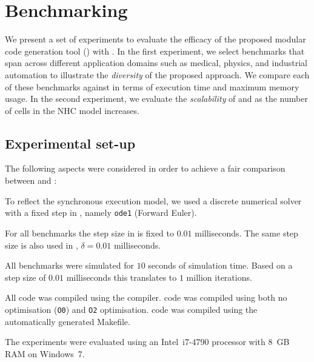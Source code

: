 \section{Benchmarking}
\label{sec:benchmarking}


We present a set of experiments to evaluate the efficacy of the proposed
modular code generation tool (\ourTool) with \simulink.  In the first
experiment, we select benchmarks that span across different application
domains such as medical, physics, and industrial automation to
illustrate the \emph{diversity} of the proposed approach.  We compare
each of these benchmarks against \simulink in terms of execution time
and maximum memory usage.  In the second experiment, we evaluate the
\emph{scalability} of \ourTool and \simulink as the number of cells in
the \ac{NHC} model increases.


\subsection{Experimental set-up}
\label{sec:experimentalSetUp}
The following aspects were considered in order to achieve a fair
comparison between \ourTool and \simulink:

\begin{description}
\item[\textbf{Solver}] To reflect the synchronous execution model, we
  used a discrete numerical solver with a fixed step in \simulink,
  namely \texttt{ode1} (Forward Euler).
  
\item[\textbf{Step Size}] For all benchmarks the step size in \simulink
  is fixed to $0.01$ milliseconds.  The same step size is also used in
  \ourTool, $\delta = 0.01$ milliseconds.
  
\item[\textbf{Time}] All benchmarks were simulated for $10$ seconds of
  simulation time.  Based on a step size of $0.01$ milliseconds this
  translates to $1$ million iterations.
  
\item[\textbf{Compiler}] All code was compiled using the \compiler
  compiler.  \ourTool code was compiled using both no optimisation
  (\texttt{O0}) and \texttt{O2} optimisation.  \simulink code was
  compiled using the automatically generated Makefile.
\end{description}

The experiments were evaluated using an Intel~i7-4790 processor with
8~GB RAM on Windows~7.


